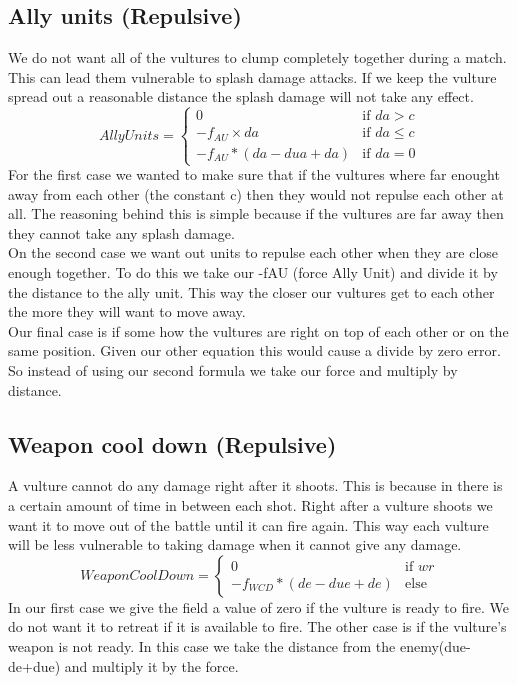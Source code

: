 	\subsection*{Ally units (Repulsive)}
We do not want all of the vultures to clump completely together during a match. This can lead them vulnerable to splash damage attacks. If we keep the vulture spread out a reasonable distance the splash damage will not take any effect.
		\begin{displaymath}
			AllyUnits = \begin{cases}
					0 & \text{if } da > c\\
					-f_{AU} \times da & \text{if } da \leq c\\
					-f_{AU} * (da - dua + da) & \text{if } da = 0
				\end{cases}		
		\end{displaymath}
	For the first case we wanted to make sure that if the vultures where far enought away from each other (the constant c) then they would not repulse each other at all. The reasoning behind this is simple because if the vultures are far away then they cannot take any splash damage.\\
	On the second case we want out units to repulse each other when they are close enough together. To do this we take our -fAU (force Ally Unit) and divide it by the distance to the ally unit. This way the closer our vultures get to each other the more they will want to move away.\\
	Our final case is if some how the vultures are right on top of each other or on the same position. Given our other equation this would cause a divide by zero error. So instead of using our second formula we take our force and multiply by distance.\\
	\subsection*{Weapon cool down (Repulsive)}
A vulture cannot do any damage right after it shoots. This is because in there is a certain amount of time in between each shot. Right after a vulture shoots we want it to move out of the battle until it can fire again. This way each vulture will be less vulnerable to taking damage when it cannot give any damage.
		\begin{displaymath}
			WeaponCoolDown = \begin{cases}
					0 & \text{if } wr\\
					-f_{WCD} * (de - due + de) & \text{else}
				\end{cases}		
		\end{displaymath}
In our first case we give the field a value of zero if the vulture is ready to fire. We do not want it to retreat if it is available to fire.
The other case is if the vulture's weapon is not ready. In this case we take the distance from the enemy(due-de+due) and multiply it by the force.
